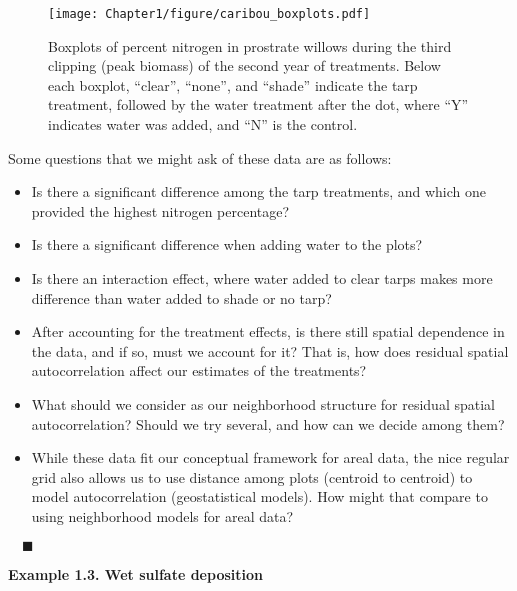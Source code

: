 %
\begin{figure}
\begin{center}
\texttt{[image: Chapter1/figure/caribou\_boxplots.pdf]}
\caption{Boxplots of percent nitrogen in prostrate willows during the third clipping (peak biomass) of the second year of treatments.  Below each boxplot, ``clear'', ``none'', and ``shade'' indicate the tarp treatment, followed by the water treatment after the dot, where ``Y'' indicates water was added, and ``N'' is the control.
\label{fig:caribouBoxplots}}
\end{center}
\end{figure}
%

Some questions that we might ask of these data are as follows:
\begin{itemize}
\item Is there a significant difference among the tarp treatments, and which one provided the highest nitrogen percentage?
\item Is there a significant difference when adding water to the plots?  
\item Is there an interaction effect, where water added to clear tarps makes more difference than water added to shade or no tarp?
\item After accounting for the treatment effects, is there still spatial dependence in the data, and if so, must we account for it?  That is, how does residual spatial autocorrelation affect our estimates of the treatments?
\item What should we consider as our neighborhood structure for residual spatial autocorrelation?  Should we try several, and how can we decide among them?
\item While these data fit our conceptual framework for areal data, the nice regular grid also allows us to use distance among plots (centroid to centroid) to model autocorrelation (geostatistical models).  How might that compare to using neighborhood models for areal data?
\end{itemize}

$\quad\blacksquare$
\vspace{.5in}

\begin{tcolorbox}
{\bf Example 1.3. Wet sulfate deposition}
\end{tcolorbox}
\vspace{.1in}

